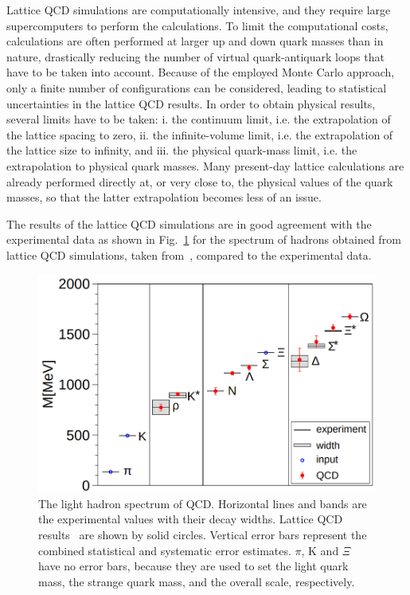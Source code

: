Lattice QCD simulations are computationally intensive, and they require large supercomputers to perform the calculations. To limit the computational costs, calculations are often performed at larger up and down quark masses than in nature, drastically reducing the number of virtual quark-antiquark loops that have to be taken into account. Because of the employed Monte Carlo approach, only a finite number of configurations can be considered, leading to statistical uncertainties in the lattice QCD results. In order to obtain physical results, several limits have to be taken: i. the continuum limit, i.e. the extrapolation of the lattice spacing to zero, ii. the infinite-volume limit, i.e. the extrapolation of the lattice size to infinity, and iii. the physical quark-mass limit, i.e. the extrapolation to physical quark masses. Many present-day lattice calculations are already performed directly at, or very close to, the physical values of the quark masses, so that the latter extrapolation becomes less of an issue. 

The results of the lattice QCD simulations are in good agreement with the experimental data as shown in Fig.~\ref{fig:LQCD_hadron_mass} for the spectrum of hadrons obtained from lattice QCD simulations, taken from~\cite{BMW:2008jgk}, compared to the experimental data.
\begin{figure}[t!]
  \centering
  \includegraphics[width=0.7\linewidth]{Figures/Chapter 1/LQCD_hadron_mass.png}
  \caption{The light hadron spectrum of QCD. Horizontal lines and bands are the experimental values with their decay widths. Lattice QCD results~\cite{BMW:2008jgk} are shown by solid circles. Vertical error bars represent the combined statistical and systematic error estimates. $\pi$, K and $\Xi$ have no error bars, because they are used to set the light quark mass, the strange quark mass, and the overall scale, respectively.}
  \label{fig:LQCD_hadron_mass}
\end{figure}

